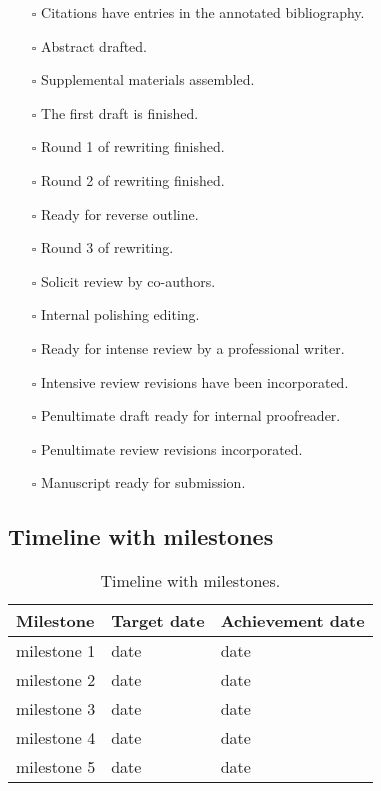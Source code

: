 \documentclass[11pt,letterpaper]{article}
\begin{document}
\begin{itemize}
\item[{$\square$}] Citations have entries in the annotated bibliography.
\item[{$\square$}] Abstract drafted.
\item[{$\square$}] Supplemental materials assembled.
\item[{$\square$}] The first draft is finished.
\item[{$\square$}] Round 1 of rewriting finished.
\item[{$\square$}] Round 2 of rewriting finished.
\item[{$\square$}] Ready for reverse outline.
\item[{$\square$}] Round 3 of rewriting.
\item[{$\square$}] Solicit review by co-authors.
\item[{$\square$}] Internal polishing editing.
\item[{$\square$}] Ready for intense review by a professional writer.
\item[{$\square$}] Intensive review revisions have been incorporated.
\item[{$\square$}] Penultimate draft ready for internal proofreader.
\item[{$\square$}] Penultimate review revisions incorporated.
\item[{$\square$}] Manuscript ready for submission.
\end{itemize}




\subsection{Timeline with milestones}
\label{sec:orge523420}

\begin{table}[htbp]
\caption[Milestones]{Timeline with milestones.}
\centering
\begin{tabular}{lll}
Milestone & Target date & Achievement date\\[0pt]
\hline
milestone 1 & date & date\\[0pt]
milestone 2 & date & date\\[0pt]
milestone 3 & date & date\\[0pt]
milestone 4 & date & date\\[0pt]
milestone 5 & date & date\\[0pt]
\end{tabular}
\end{table}
\end{document}
